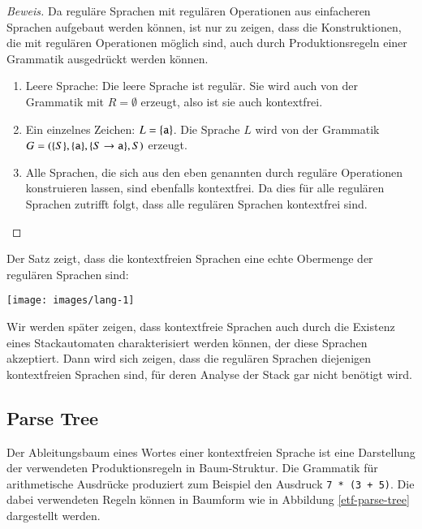 \begin{proof}[Beweis]
Da reguläre Sprachen mit regulären Operationen aus einfacheren
Sprachen aufgebaut werden können, ist nur zu zeigen, dass die
Konstruktionen, die mit regulären Operationen möglich sind,
auch durch Produktionsregeln einer Grammatik ausgedrückt werden
können. 
\begin{enumerate}
\item Leere Sprache: Die leere Sprache ist regulär. Sie wird auch 
von der Grammatik mit $R=\emptyset$ erzeugt, also ist sie auch
kontextfrei.
\item Ein einzelnes Zeichen: $L=\{{\tt a}\}$. Die Sprache $L$ wird von
der Grammatik $G=(\{S\}, \{{\tt a}\}, \{S\to{\tt a}\}, S)$
erzeugt.
\item Alle Sprachen, die sich aus den eben genannten durch reguläre
Operationen konstruieren lassen, sind ebenfalls kontextfrei. Da
dies für alle regulären Sprachen zutrifft folgt, dass alle
regulären Sprachen kontextfrei sind.
\end{enumerate}
\end{proof}

Der Satz zeigt, dass die kontextfreien Sprachen eine echte
Obermenge der regulären Sprachen sind:
\begin{center}
\texttt{[image: images/lang-1]}
\end{center}
Wir werden später zeigen, dass kontextfreie Sprachen auch durch
die Existenz eines Stackautomaten charakterisiert werden können,
der diese Sprachen akzeptiert. Dann wird sich zeigen, dass 
die regulären Sprachen diejenigen kontextfreien Sprachen sind,
für deren Analyse der Stack gar nicht benötigt wird.

\subsection{Parse Tree}
%
%
Der Ableitungsbaum eines Wortes einer kontextfreien Sprache
ist eine Darstellung der verwendeten Produktionsregeln in Baum-Struktur.
%
Die Grammatik für arithmetische Ausdrücke produziert zum Beispiel
den Ausdruck {\tt 7 * (3 + 5)}.
Die dabei verwendeten Regeln können in Baumform wie in
Abbildung \ref{etf-parse-tree} dargestellt werden.

